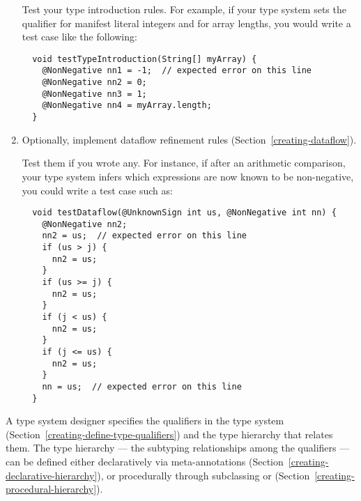 \begin{enumerate}
  Test your type introduction rules.
  For example, if your type system sets the qualifier for manifest literal
  integers and for array lengths, you would write a test case like the following:

\begin{Verbatim}
  void testTypeIntroduction(String[] myArray) {
    @NonNegative nn1 = -1;  // expected error on this line
    @NonNegative nn2 = 0;
    @NonNegative nn3 = 1;
    @NonNegative nn4 = myArray.length;
  }
\end{Verbatim}

\item
  Optionally, implement dataflow refinement rules
  (Section~\ref{creating-dataflow}).

  Test them if you wrote any.
  For instance, if after an arithmetic comparison, your type system infers
  which expressions are now known to be non-negative, you could write a
  test case such as:

\begin{Verbatim}
  void testDataflow(@UnknownSign int us, @NonNegative int nn) {
    @NonNegative nn2;
    nn2 = us;  // expected error on this line
    if (us > j) {
      nn2 = us;
    }
    if (us >= j) {
      nn2 = us;
    }
    if (j < us) {
      nn2 = us;
    }
    if (j <= us) {
      nn2 = us;
    }
    nn = us;  // expected error on this line
  }
\end{Verbatim}

\end{enumerate}





A type system designer specifies the qualifiers in the type system (Section~\ref{creating-define-type-qualifiers})
and
the type hierarchy that relates them.
The type hierarchy --- the subtyping relationships among the qualifiers ---
can be defined either
declaratively via meta-annotations (Section~\ref{creating-declarative-hierarchy}), or procedurally through
subclassing  or
 (Section~\ref{creating-procedural-hierarchy}).




